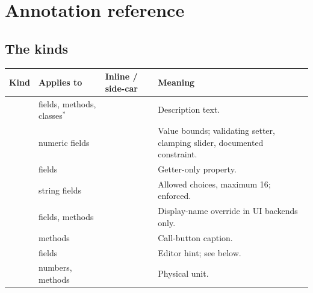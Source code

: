 \chapter{Annotation reference}
\label{app:annotations}

\section{The kinds}

\begin{center}
\small
\begin{longtable}{@{}L{2.5cm}L{2.0cm}L{5.2cm}L{4.2cm}@{}}
\toprule
\textbf{Kind} & \textbf{Applies to} & \textbf{Inline / side-car} &
  \textbf{Meaning} \\
\midrule
\endhead
{} & fields, methods, classes$^*$ &
   \newline {} &
  Description text. \\
\addlinespace
{} & numeric fields &
   \newline {} &
  Value bounds; validating setter, clamping slider, documented constraint. \\
\addlinespace
{} & fields &
   \newline {} &
  Getter-only property. \\
\addlinespace
{} & string fields &
   \newline
   &
  Allowed choices, maximum 16; enforced. \\
\addlinespace
{} & fields, methods &
   \newline {} &
  Display-name override in UI backends only. \\
\addlinespace
{} & methods &
   \newline {} &
  Call-button caption. \\
\addlinespace
{} & fields &
   \newline {} &
  Editor hint; see below. \\
\addlinespace
{} & numbers, methods &  \newline {} &
  Physical unit. \\

\end{longtable}
\end{center}
